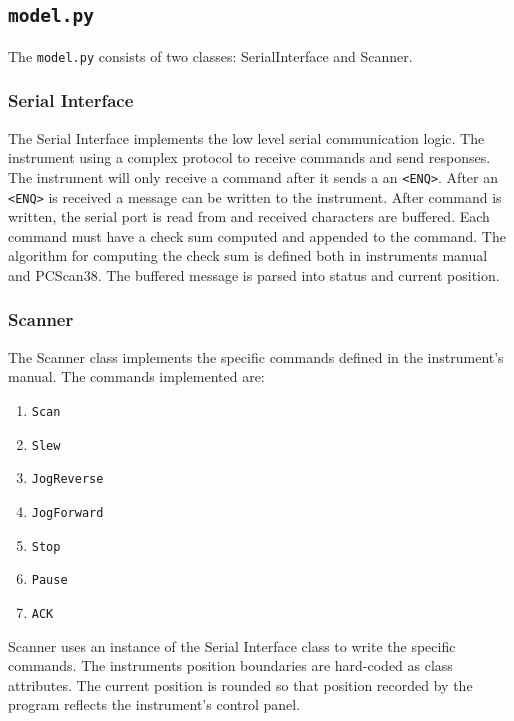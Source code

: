 \documentclass[11pt]{article}
\def\code#1{\texttt{#1}}
\begin{document}
\subsection{\texttt{model.py}}
The \texttt{model.py} consists of two classes: SerialInterface and Scanner.
\subsubsection{Serial Interface}
The Serial Interface implements the low level serial communication logic. The instrument using a complex protocol to receive commands and send responses. The instrument will only receive a command after it sends a an \code{<ENQ>}. After an \code{<ENQ>} is received a message can be written to the instrument. After command is written, the serial port is read from and received characters are buffered.
Each command must have a check sum computed and appended to the command. The algorithm for computing the check sum is defined both in instruments manual and PCScan38.
The buffered message is parsed into status and current position. 
\subsubsection{Scanner}
The Scanner class implements the specific commands defined in the instrument's manual. The commands implemented are:
\begin{enumerate}
    \item \texttt{Scan}
    \item \texttt{Slew}
    \item \texttt{JogReverse}
    \item \texttt{JogForward}
    \item \texttt{Stop}
    \item \texttt{Pause}
    \item \texttt{ACK}
\end{enumerate}
Scanner uses an instance of the Serial Interface class to write the specific commands.
The instruments position boundaries are hard-coded as class attributes.  
The current position is rounded so that position recorded by the program reflects the instrument's control panel. 
\end{document}
